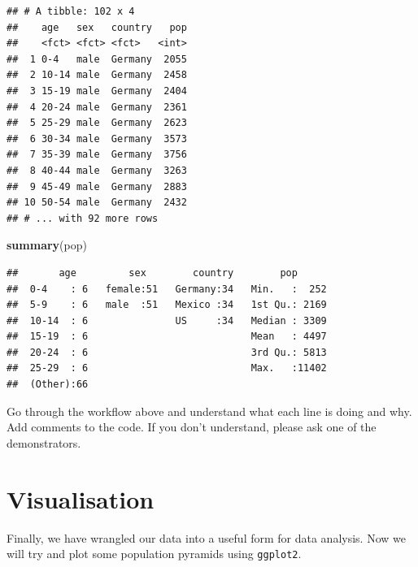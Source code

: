 \documentclass[]{book}
\newenvironment{Shaded}{\begin{snugshade}}{\end{snugshade}}
\newcommand{\KeywordTok}[1]{\textcolor[rgb]{0.13,0.29,0.53}{\textbf{{#1}}}}
\newcommand{\NormalTok}[1]{{#1}}
\newcommand{\bblockT}[1]{\begin{tcolorbox}[title = Task #1]}
\newcommand{\eblockT}{\end{tcolorbox}}
\theoremstyle{definition}
\theoremstyle{definition}
\theoremstyle{definition}
\theoremstyle{remark}
\begin{document}
\begin{verbatim}
## # A tibble: 102 x 4
##    age   sex   country   pop
##    <fct> <fct> <fct>   <int>
##  1 0-4   male  Germany  2055
##  2 10-14 male  Germany  2458
##  3 15-19 male  Germany  2404
##  4 20-24 male  Germany  2361
##  5 25-29 male  Germany  2623
##  6 30-34 male  Germany  3573
##  7 35-39 male  Germany  3756
##  8 40-44 male  Germany  3263
##  9 45-49 male  Germany  2883
## 10 50-54 male  Germany  2432
## # ... with 92 more rows
\end{verbatim}

\begin{Shaded}
\begin{Highlighting}[]
\KeywordTok{summary}\NormalTok{(pop)}
\end{Highlighting}
\end{Shaded}

\begin{verbatim}
##       age         sex        country        pop       
##  0-4    : 6   female:51   Germany:34   Min.   :  252  
##  5-9    : 6   male  :51   Mexico :34   1st Qu.: 2169  
##  10-14  : 6               US     :34   Median : 3309  
##  15-19  : 6                            Mean   : 4497  
##  20-24  : 6                            3rd Qu.: 5813  
##  25-29  : 6                            Max.   :11402  
##  (Other):66
\end{verbatim}

\hypertarget{tsk16}{}\bblockT{16}

Go through the workflow above and understand what each line is doing and
why. Add comments to the code. If you don't understand, please ask one
of the demonstrators. \eblockT

\section{Visualisation}\label{visualisation}

Finally, we have wrangled our data into a useful form for data analysis.
Now we will try and plot some population pyramids using
\texttt{ggplot2}.
\end{document}

